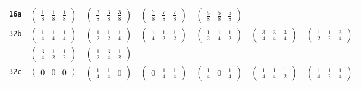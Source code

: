 \documentclass[fleqn,9pt,landscape]{jsarticle}
\begin{document}
\begin{center}
\begin{longtable}{ccccccc}
{\tt 16a} & $ \begin{pmatrix} \frac{1}{8} & \frac{1}{8} & \frac{1}{8} \end{pmatrix} $ & $ \begin{pmatrix} \frac{3}{8} & \frac{3}{8} & \frac{3}{8} \end{pmatrix} $ & $ \begin{pmatrix} \frac{7}{8} & \frac{7}{8} & \frac{7}{8} \end{pmatrix} $ & $ \begin{pmatrix} \frac{5}{8} & \frac{5}{8} & \frac{5}{8} \end{pmatrix} $ & $  $ & $  $ \\ \hline
{\tt 32b} & $ \begin{pmatrix} \frac{1}{4} & \frac{1}{4} & \frac{1}{4} \end{pmatrix} $ & $ \begin{pmatrix} \frac{1}{2} & \frac{1}{2} & \frac{1}{4} \end{pmatrix} $ & $ \begin{pmatrix} \frac{1}{4} & \frac{1}{2} & \frac{1}{2} \end{pmatrix} $ & $ \begin{pmatrix} \frac{1}{2} & \frac{1}{4} & \frac{1}{2} \end{pmatrix} $ & $ \begin{pmatrix} \frac{3}{4} & \frac{3}{4} & \frac{3}{4} \end{pmatrix} $ & $ \begin{pmatrix} \frac{1}{2} & \frac{1}{2} & \frac{3}{4} \end{pmatrix} $ \\
& $ \begin{pmatrix} \frac{3}{4} & \frac{1}{2} & \frac{1}{2} \end{pmatrix} $ & $ \begin{pmatrix} \frac{1}{2} & \frac{3}{4} & \frac{1}{2} \end{pmatrix} $ & $  $ & $  $ & $  $ & $  $ \\ \hline
{\tt 32c} & $ \begin{pmatrix} 0 & 0 & 0 \end{pmatrix} $ & $ \begin{pmatrix} \frac{1}{4} & \frac{1}{4} & 0 \end{pmatrix} $ & $ \begin{pmatrix} 0 & \frac{1}{4} & \frac{1}{4} \end{pmatrix} $ & $ \begin{pmatrix} \frac{1}{4} & 0 & \frac{1}{4} \end{pmatrix} $ & $ \begin{pmatrix} \frac{1}{4} & \frac{1}{4} & \frac{1}{2} \end{pmatrix} $ & $ \begin{pmatrix} \frac{1}{4} & \frac{1}{2} & \frac{1}{4} \end{pmatrix} $ \\

\end{longtable}
\end{center}
\end{document}
